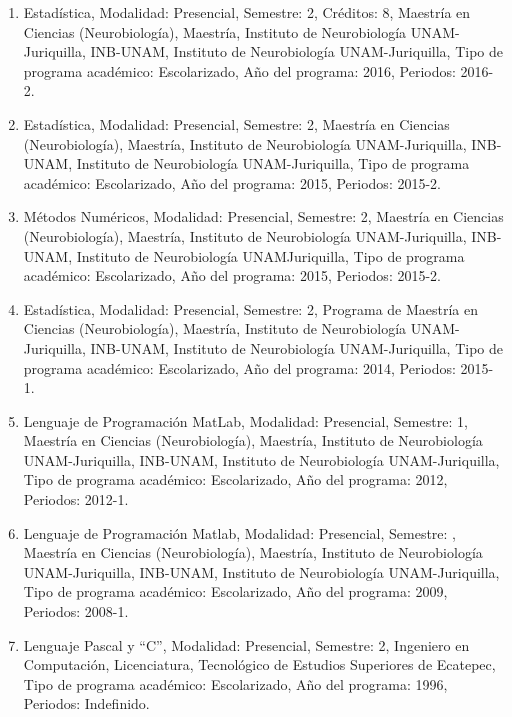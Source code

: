 \begin{enumerate}
\item Estadística, Modalidad: Presencial, Semestre: 2, Créditos: 8, Maestría en Ciencias (Neurobiología), Maestría, Instituto de Neurobiología 
UNAM-Juriquilla, INB-UNAM, Instituto de Neurobiología 
UNAM-Juriquilla, Tipo de programa académico: Escolarizado, Año del programa: 2016, Periodos: 2016-2.

\item Estadística, Modalidad: Presencial, Semestre: 2, Maestría en Ciencias (Neurobiología), Maestría, Instituto de 
Neurobiología UNAM-Juriquilla, INB-UNAM, Instituto de Neurobiología UNAM-Juriquilla, Tipo de programa académico: 
Escolarizado, Año del programa: 2015, Periodos: 2015-2.

\item Métodos Numéricos, Modalidad: Presencial, Semestre: 2, Maestría en Ciencias (Neurobiología), Maestría, Instituto de 
Neurobiología UNAM-Juriquilla, INB-UNAM, Instituto de Neurobiología UNAMJuriquilla, Tipo de programa académico: 
Escolarizado, Año del programa: 2015, Periodos: 2015-2.

\item Estadística, Modalidad: Presencial, Semestre: 2, Programa de Maestría en Ciencias (Neurobiología), Maestría, Instituto 
de Neurobiología UNAM-Juriquilla, INB-UNAM, Instituto de Neurobiología UNAM-Juriquilla, Tipo de programa académico: 
Escolarizado, Año del programa: 2014, Periodos: 2015-1.

\item Lenguaje de Programación MatLab, Modalidad: Presencial, Semestre: 1, Maestría en Ciencias (Neurobiología), Maestría, 
Instituto de Neurobiología UNAM-Juriquilla, INB-UNAM, Instituto de Neurobiología UNAM-Juriquilla, Tipo de programa 
académico: Escolarizado, Año del programa: 2012, Periodos: 2012-1.

\item Lenguaje de Programación Matlab, Modalidad: Presencial, Semestre: , Maestría en Ciencias (Neurobiología), Maestría, 
Instituto de Neurobiología UNAM-Juriquilla, INB-UNAM, Instituto de Neurobiología UNAM-Juriquilla, Tipo de programa 
académico: Escolarizado, Año del programa: 2009, Periodos: 2008-1.

\item Lenguaje Pascal y “C”, Modalidad: Presencial, Semestre: 2, Ingeniero en Computación, Licenciatura, Tecnológico de 
Estudios Superiores de Ecatepec, Tipo de programa académico: Escolarizado, Año del programa: 1996, Periodos: Indefinido.


\end{enumerate}
